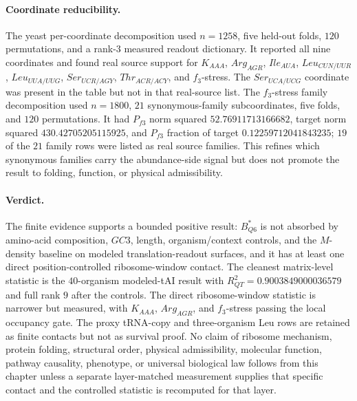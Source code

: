 \paragraph{Coordinate reducibility.}
The yeast per-coordinate decomposition used $n=1258$, five held-out folds, $120$ permutations, and a rank-$3$ measured readout dictionary. It reported all nine coordinates and found real source support for $K_{AAA}$, $Arg_{AGR}$, $Ile_{AUA}$, $Leu_{CUN/UUR}$, $Leu_{UUA/UUG}$, $Ser_{UCR/AGY}$, $Thr_{ACR/ACY}$, and $f_3$-stress. The $Ser_{UCA/UCG}$ coordinate was present in the table but not in that real-source list. The $f_3$-stress family decomposition used $n=1800$, $21$ synonymous-family subcoordinates, five folds, and $120$ permutations. It had $P_{f3}$ norm squared $52.76911713166682$, target norm squared $430.42705205115925$, and $P_{f3}$ fraction of target $0.12259712041843235$; $19$ of the $21$ family rows were listed as real source families. This refines which synonymous families carry the abundance-side signal but does not promote the result to folding, function, or physical admissibility.

\paragraph{Verdict.}
The finite evidence supports a bounded positive result: $B^{*}_{Q6}$ is not absorbed by amino-acid composition, $GC3$, length, organism/context controls, and the $M$-density baseline on modeled translation-readout surfaces, and it has at least one direct position-controlled ribosome-window contact. The cleanest matrix-level statistic is the $40$-organism modeled-tAI result with $R^2_{QT}=0.9003849000036579$ and full rank $9$ after the controls. The direct ribosome-window statistic is narrower but measured, with $K_{AAA}$, $Arg_{AGR}$, and $f_3$-stress passing the local occupancy gate. The proxy tRNA-copy and three-organism Leu rows are retained as finite contacts but not as survival proof. No claim of ribosome mechanism, protein folding, structural order, physical admissibility, molecular function, pathway causality, phenotype, or universal biological law follows from this chapter unless a separate layer-matched measurement supplies that specific contact and the controlled statistic is recomputed for that layer.
